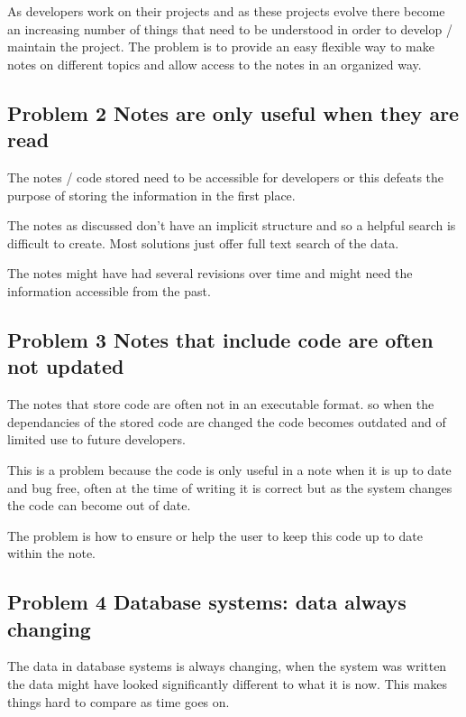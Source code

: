 As developers work on their projects and as these projects evolve there
become an increasing number of things that need to be understood in
order to develop / maintain the project. The problem is to provide an
easy flexible way to make notes on different topics and allow access to
the notes in an organized way.

\subsection{Problem 2 Notes are only useful when they are
read}\label{problem-2-notes-are-only-useful-when-they-are-read}

The notes / code stored need to be accessible for developers or this
defeats the purpose of storing the information in the first place.

The notes as discussed don't have an implicit structure and so a helpful
search is difficult to create. Most solutions just offer full text
search of the data.

The notes might have had several revisions over time and might need the
information accessible from the past.

\subsection{Problem 3 Notes that include code are often not
updated}\label{problem-3-notes-that-include-code-are-often-not-updated}

The notes that store code are often not in an executable format. so when
the dependancies of the stored code are changed the code becomes
outdated and of limited use to future developers.

This is a problem because the code is only useful in a note when it is
up to date and bug free, often at the time of writing it is correct but
as the system changes the code can become out of date.

The problem is how to ensure or help the user to keep this code up to
date within the note.

\subsection{Problem 4 Database systems: data always
changing}\label{problem-4-database-systems-data-always-changing}

The data in database systems is always changing, when the system was
written the data might have looked significantly different to what it is
now. This makes things hard to compare as time goes on.

